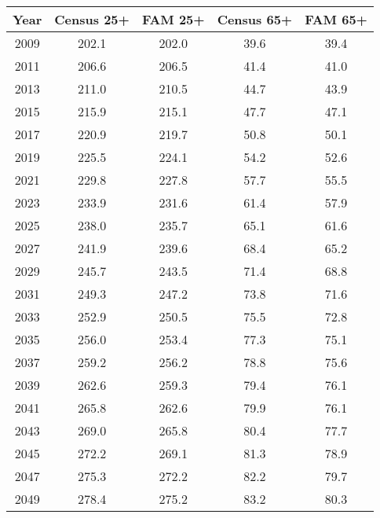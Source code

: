 \begin{tabular} {ccccc}
\hline
Year & Census 25+ & FAM 25+ & Census 65+ & FAM 65+  \\
\hline 
2009&202.1&202.0&39.6&39.4\\
2011&206.6&206.5&41.4&41.0\\
2013&211.0&210.5&44.7&43.9\\
2015&215.9&215.1&47.7&47.1\\
2017&220.9&219.7&50.8&50.1\\
2019&225.5&224.1&54.2&52.6\\
2021&229.8&227.8&57.7&55.5\\
2023&233.9&231.6&61.4&57.9\\
2025&238.0&235.7&65.1&61.6\\
2027&241.9&239.6&68.4&65.2\\
2029&245.7&243.5&71.4&68.8\\
2031&249.3&247.2&73.8&71.6\\
2033&252.9&250.5&75.5&72.8\\
2035&256.0&253.4&77.3&75.1\\
2037&259.2&256.2&78.8&75.6\\
2039&262.6&259.3&79.4&76.1\\
2041&265.8&262.6&79.9&76.1\\
2043&269.0&265.8&80.4&77.7\\
2045&272.2&269.1&81.3&78.9\\
2047&275.3&272.2&82.2&79.7\\
2049&278.4&275.2&83.2&80.3\\
\hline 
\end{tabular} 
